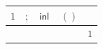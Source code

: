 {\scriptsize\setlength{\tabcolsep}{1.5pt}%
\begin{tabular}{cccc|l}
$\text{1}$ & $;$ & $\mathsf{inl}\,$ & $()$ & \\ \hline
\gcell{$\posD{\bullet}$} & \gcell{$$} & \gcell{$\posC{\circ}$} & \gcell{$$} & $\text{1}$ \\
\end{tabular}}

